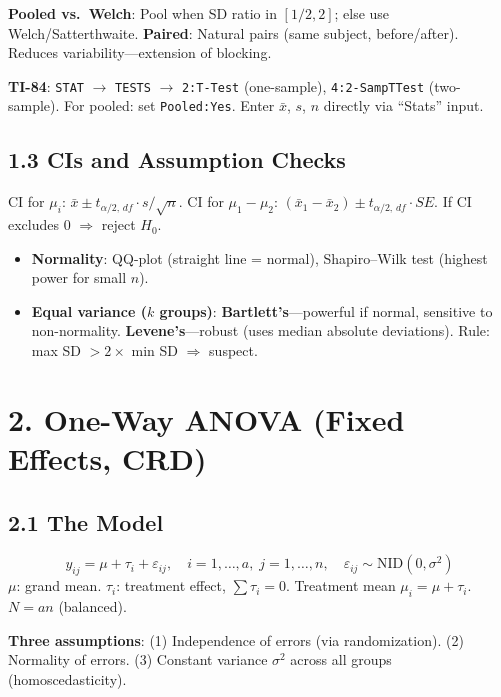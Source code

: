 \documentclass[9pt,letterpaper]{article}
\begin{document}
\textbf{Pooled vs.\ Welch}: Pool when SD ratio in $[1/2, 2]$; else use Welch/Satterthwaite. \textbf{Paired}: Natural pairs (same subject, before/after). Reduces variability---extension of blocking.

\begin{calcbox}
\textbf{TI-84}: \texttt{STAT} $\to$ \texttt{TESTS} $\to$ \texttt{2:T-Test} (one-sample), \texttt{4:2-SampTTest} (two-sample). For pooled: set \texttt{Pooled:Yes}. Enter $\bar{x}$, $s$, $n$ directly via ``Stats'' input.
\end{calcbox}

\subsection{1.3 CIs and Assumption Checks}

CI for $\mu_i$: $\bar{x} \pm t_{\alpha/2,\,df}\cdot s/\sqrt{n}$. CI for $\mu_1 - \mu_2$: $(\bar{x}_1 - \bar{x}_2) \pm t_{\alpha/2,\,df}\cdot SE$. If CI excludes 0 $\Rightarrow$ reject $H_0$.

\begin{itemize}
    \item \textbf{Normality}: QQ-plot (straight line = normal), Shapiro--Wilk test (highest power for small $n$).
    \item \textbf{Equal variance ($k$ groups)}: \textbf{Bartlett's}---powerful if normal, sensitive to non-normality. \textbf{Levene's}---robust (uses median absolute deviations). Rule: max SD $> 2\times$ min SD $\Rightarrow$ suspect.
\end{itemize}

\section{2. One-Way ANOVA (Fixed Effects, CRD)}

\subsection{2.1 The Model}
\[
y_{ij} = \mu + \tau_i + \varepsilon_{ij}, \quad i=1,\ldots,a,\; j=1,\ldots,n, \quad \varepsilon_{ij}\sim \text{NID}(0,\sigma^2)
\]
$\mu$: grand mean. $\tau_i$: treatment effect, $\sum\tau_i=0$. Treatment mean $\mu_i=\mu+\tau_i$. $N=an$ (balanced).

\textbf{Three assumptions}: (1) Independence of errors (via randomization). (2) Normality of errors. (3) Constant variance $\sigma^2$ across all groups (homoscedasticity).
\end{document}
